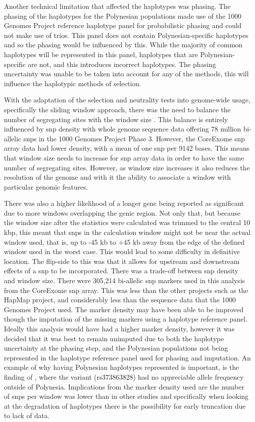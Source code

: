 \documentclass[twoside,openright]{report}
\begin{document}
Another technical limitation that affected the haplotypes was phasing.
The phasing of the haplotypes for the Polynesian populations made use of
the 1000 Genomes Project reference haplotype panel for probabilistic
phasing and could not make use of trios. This panel does not contain
Polynesian-specific haplotypes and so the phasing would be influenced by
this. While the majority of common haplotypes will be represented in
this panel, haplotypes that are Polynesian-specific are not, and this
introduces incorrect haplotypes. The phasing uncertainty was unable to
be taken into account for any of the methods, this will influence the
haplotypic methods of selection.

With the adaptation of the selection and neutrality tests into
genome-wide usage, specifically the sliding window approach, there was
the need to balance the number of segregating sites with the window size
\citep{Pybus2014}. This balance is entirely influenced by \gls{snp}
density with whole genome sequence data offering 78 million bi-allelic
\glspl{snp} in the 1000 Genomes Project Phase 3. However, the CoreExome
\gls{snp} array data had lower density, with a mean of one \gls{snp} per
9142 bases. This means that window size needs to increase for \gls{snp}
array data in order to have the same number of segregating sites.
However, as window size increases it also reduces the resolution of the
genome and with it the ability to associate a window with particular
genomic features.

There was also a higher likelihood of a longer gene being reported as
significant due to more windows overlapping the genic region. Not only
that, but because the window size after the statistics were calculated
was trimmed to the central 10 kbp, this meant that \glspl{snp} in the
calculation window might not be near the actual window used, that is, up
to -45 kb to +45 kb away from the edge of the defined window used in the
worst case. This would lead to some difficulty in definitive location.
The flip-side to this was that it allows for upstream and downstream
effects of a \gls{snp} to be incorporated. There was a trade-off between
\gls{snp} density and window size. There were 305,214 bi-allelic
\gls{snp} markers used in this analysis from the CoreExome \gls{snp}
array. This was less than the other projects such as the HapMap project,
and considerably less than the sequence data that the 1000 Genomes
Project used. The marker density may have been able to be improved
though the imputation of the missing markers using a haplotype reference
panel. Ideally this analysis would have had a higher marker density,
however it was decided that it was best to remain unimputed due to both
the haplotype uncertainty at the phasing step, and the Polynesian
populations not being represented in the haplotype reference panel used
for phasing and imputation. An example of why having Polynesian
haplotypes represented is important, is the finding of
\citet{Minster2016}, where the variant (rs373863828) had no appreciable
allele frequency outside of Polynesia. Implications from the marker
density used are the number of \glspl{snp} per window was lower than in
other studies and specifically when looking at the degradation of
haplotypes there is the possibility for early truncation due to lack of
data.
\end{document}
